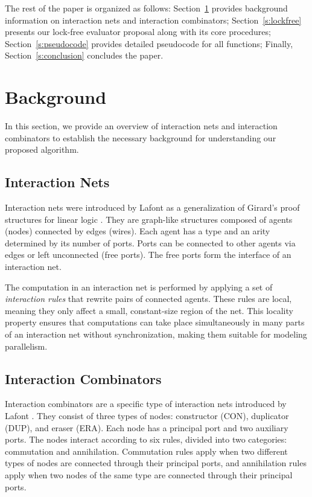 \documentclass{article}
\begin{document}
The rest of the paper is organized as follows: Section~\ref{s:background} provides background information on interaction nets and interaction combinators; Section~\ref{s:lockfree} presents our lock-free evaluator proposal along with its core procedures; Section~\ref{s:pseudocode} provides detailed pseudocode for all functions; Finally, Section~\ref{s:conclusion} concludes the paper.

\section{Background}\label{s:background}

In this section, we provide an overview of interaction nets and interaction combinators to establish the necessary background for understanding our proposed algorithm.

\subsection{Interaction Nets}\label{ss:intnets}

Interaction nets were introduced by Lafont as a generalization of Girard's proof structures for linear logic \cite{girard}. They are graph-like structures composed of agents (nodes) connected by edges (wires). Each agent has a type and an arity determined by its number of ports. Ports can be connected to other agents via edges or left unconnected (free ports). The free ports form the interface of an interaction net.

The computation in an interaction net is performed by applying a set of \textit{interaction rules} that rewrite pairs of connected agents. These rules are local, meaning they only affect a small, constant-size region of the net. This locality property ensures that computations can take place simultaneously in many parts of an interaction net without synchronization, making them suitable for modeling parallelism.

\subsection{Interaction Combinators}\label{ss:intcombs}

Interaction combinators are a specific type of interaction nets introduced by Lafont \cite{lafont}. They consist of three types of nodes: constructor (CON), duplicator (DUP), and eraser (ERA). Each node has a principal port and two auxiliary ports. The nodes interact according to six rules, divided into two categories: commutation and annihilation. Commutation rules apply when two different types of nodes are connected through their principal ports, and annihilation rules apply when two nodes of the same type are connected through their principal ports.
\end{document}
